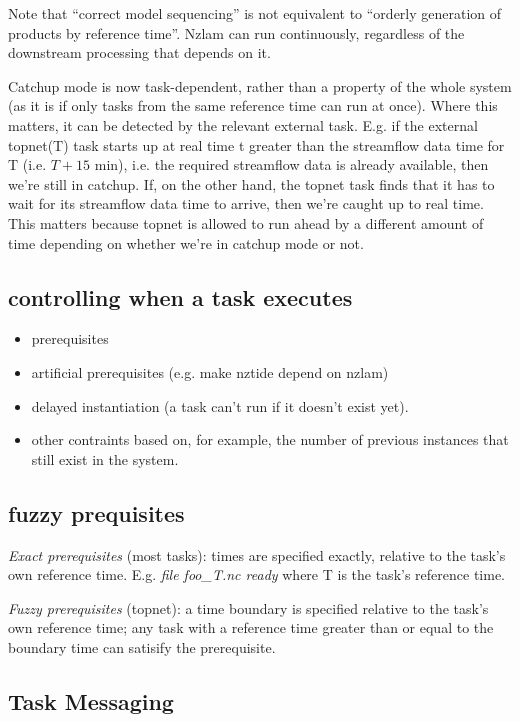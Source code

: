 \documentclass[11pt,a4paper]{article}
\begin{document}
Note that ``correct model sequencing'' is not equivalent to ``orderly
generation of products by reference time''.  Nzlam can run continuously,
regardless of the downstream processing that depends on it.

Catchup mode is now task-dependent, rather than a property of the whole
system (as it is if only tasks from the same reference time can run at
once).  Where this matters, it can be detected by the relevant external
task. E.g. if the external topnet(T) task starts up at real time t
greater than the streamflow data time for T (i.e. $T+15$ min), i.e. the
required streamflow data is already available, then we're still in
catchup. If, on the other hand, the topnet task finds that it has to
wait for its streamflow data time to arrive, then we're caught up to
real time.  This matters because topnet is allowed to run ahead by a
different amount of time depending on whether we're in catchup mode or
not.


\subsection{controlling when a task executes}

\begin{itemize}
 \item  prerequisites
 \item artificial prerequisites (e.g. make nztide depend on nzlam)
 \item delayed instantiation (a task can't run if it doesn't exist yet).
 \item other contraints based on, for example, the number of previous
 instances that still exist in the system.
\end{itemize}


\subsection{fuzzy prequisites}

{\em Exact prerequisites} (most tasks): times are specified exactly,
relative to the task's own reference time.  E.g. {\em file foo\_{T}.nc
ready} where T is the task's reference time.

{\em Fuzzy prerequisites} (topnet): a time boundary is specified
relative to the task's own reference time; any task with a reference
time greater than or equal to the boundary time can satisify the
prerequisite.

\subsection{Task Messaging}
\end{document}
